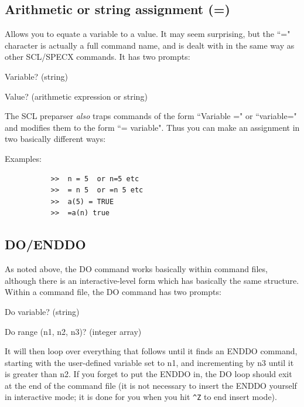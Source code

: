 \documentclass[11pt,twoside]{report}
\begin{document}
\subsection{Arithmetic or string assignment (=)}\index{=}

Allows you to equate a variable to a value. It may seem surprising, but the
``=" character is actually a full command name, and is dealt with in the same
way as other SCL/SPECX commands. It has two prompts:
\begin{description}
\item{}           Variable?  (string)
\item{}           Value?     (arithmetic expression or string)
\end{description}

The SCL preparser {\em also} traps commands of the form
``Variable =" or ``variable=" and modifies them to the form ``= variable". Thus
you can make an assignment in two basically different ways:

Examples:
\begin{verbatim}
           >>  n = 5  or n=5 etc
           >>  = n 5  or =n 5 etc
           >>  a(5) = TRUE
           >>  =a(n) true
\end{verbatim}


\subsection{DO/ENDDO}

As noted above, the DO command works basically within command files, although
there is an interactive-level form which has basically the same structure.
Within a command file, the DO command has two
prompts:
\begin{description}
\item{}             Do variable?             (string)
\item{}             Do range (n1, n2, n3)?   (integer array)
\end{description}

It will then loop over everything that follows until it finds an ENDDO command,
starting with the user-defined variable set to n1, and incrementing by n3 until
it is greater than n2. If you forget to put the ENDDO in, the DO loop should
exit at the end of the command file (it is not necessary to insert the ENDDO
yourself in interactive mode; it is done for you when you hit
\verb+^Z+ to end insert mode).
\end{document}
